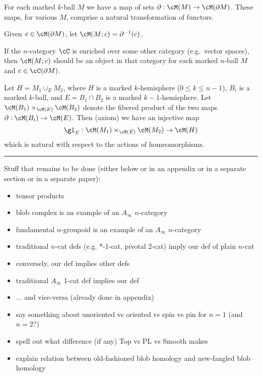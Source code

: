 {For each marked $k$-ball $M$ we have a map of sets $\bd: \cM(M)\to \cM(\bd M)$.
These maps, for various $M$, comprise a natural transformation of functors.}

Given $c\in\cM(\bd M)$, let $\cM(M; c) = \bd^{-1}(c)$.

If the $n$-category $\cC$ is enriched over some other category (e.g.\ vector spaces),
then $\cM(M; c)$ should be an object in that category for each marked $n$-ball $M$
and $c\in \cC(\bd M)$.

{Let $H = M_1 \cup_E M_2$, where $H$ is a marked $k$-hemisphere ($0\le k\le n-1$),
$B_i$ is a marked $k$-ball, and $E = B_1\cap B_2$ is a marked $k{-}1$-hemisphere.
Let $\cM(B_1) \times_{\cM(E)} \cM(B_2)$ denote the fibered product of the 
two maps $\bd: \cM(B_i)\to \cM(E)$.
Then (axiom) we have an injective map
\[
	\gl_E : \cM(M_1) \times_{\cM(E)} \cM(M_2) \to \cM(H)
\]
which is natural with respect to the actions of homeomorphisms.}







\medskip
\hrule
\medskip

\medskip


Stuff that remains to be done (either below or in an appendix or in a separate section or in
a separate paper):
\begin{itemize}
\item tensor products
\item blob complex is an example of an $A_\infty$ $n$-category
\item fundamental $n$-groupoid is an example of an $A_\infty$ $n$-category
\item traditional $n$-cat defs (e.g. *-1-cat, pivotal 2-cat) imply our def of plain $n$-cat
\item conversely, our def implies other defs
\item traditional $A_\infty$ 1-cat def implies our def
\item ... and vice-versa (already done in appendix)
\item say something about unoriented vs oriented vs spin vs pin for $n=1$ (and $n=2$?)
\item spell out what difference (if any) Top vs PL vs Smooth makes
\item explain relation between old-fashioned blob homology and new-fangled blob homology
\end{itemize}


